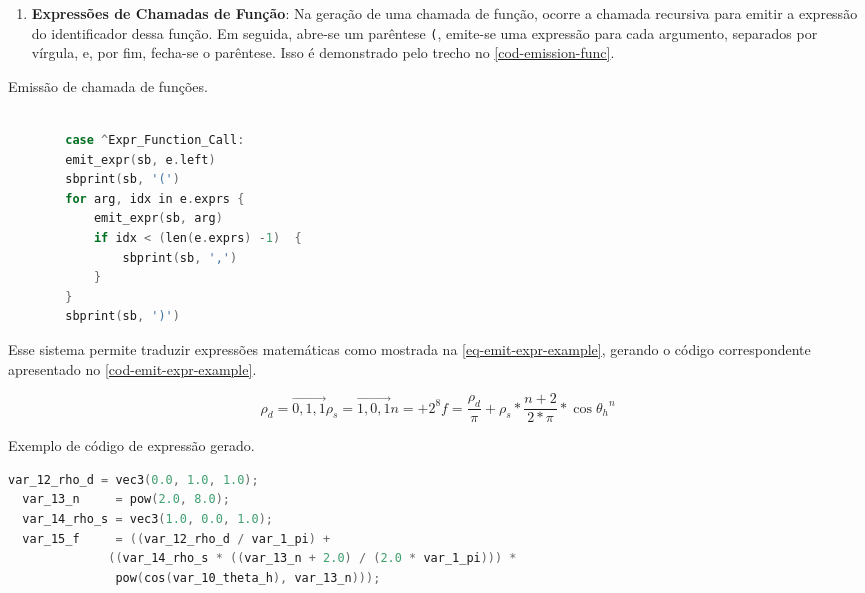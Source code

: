 \begin{enumerate}
    \item \textbf{Expressões de Chamadas de Função}:
       Na geração de uma chamada de função, ocorre a chamada recursiva para emitir a expressão do identificador dessa função. Em seguida, abre-se um parêntese \verb"(", emite-se uma expressão para cada argumento, separados por vírgula, e, por fim, fecha-se o parêntese. Isso é demonstrado pelo trecho no \autoref{cod-emission-func}.

\end{enumerate}

\begin{codigo}[htb]
    \caption{\small Emissão de chamada de funções. }
    \label{cod-emission-func}
\begin{lstlisting}[language=C, frame=none, inputencoding=utf8]

        case ^Expr_Function_Call:
        emit_expr(sb, e.left)
        sbprint(sb, '(')
        for arg, idx in e.exprs {
            emit_expr(sb, arg)
            if idx < (len(e.exprs) -1)  {
                sbprint(sb, ',')
            }
        }
        sbprint(sb, ')')
\end{lstlisting}
\end{codigo}


 Esse sistema permite traduzir expressões matemáticas como mostrada na \autoref{eq-emit-expr-example}, gerando o código correspondente apresentado no \autoref{cod-emit-expr-example}.

\begin{subequations}
    \label{eq-emit-expr-example}
\begin{equation}
    \rho_{d} = \vec{0,1,1}
\end{equation}

\begin{equation}
    \rho_{s} = \vec{1,0,1}
\end{equation}

\begin{equation}
    n = +2^8
\end{equation}

\begin{equation}
f = \frac{\rho_{d}}{\pi} + \rho_{s} * \frac{n+2}{2*\pi} *
\cos{\theta_{h}}^{n}
\end{equation}
\end{subequations}

\begin{codigo}[htb]
   \caption{\small Exemplo de código de expressão gerado. }
   \label{cod-emit-expr-example}
\begin{lstlisting}[language=C, frame=none, inputencoding=utf8]
  var_12_rho_d = vec3(0.0, 1.0, 1.0);
  var_13_n     = pow(2.0, 8.0);
  var_14_rho_s = vec3(1.0, 0.0, 1.0);
  var_15_f     = ((var_12_rho_d / var_1_pi) +
              ((var_14_rho_s * ((var_13_n + 2.0) / (2.0 * var_1_pi))) *
               pow(cos(var_10_theta_h), var_13_n)));
\end{lstlisting}
\end{codigo}

